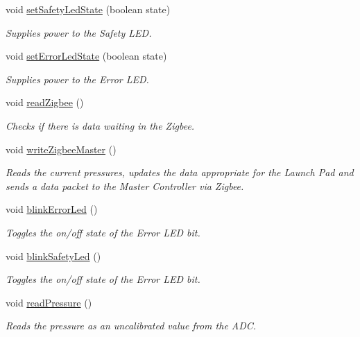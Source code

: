 \begin{DoxyCompactItemize}
\item 
void \hyperlink{launchPad_8ino_aa6ea37e78ab121d0e64b0184ed4a3e7c}{set\-Safety\-Led\-State} (boolean state)
\begin{DoxyCompactList}\small\item\em \-Supplies power to the \-Safety \-L\-E\-D. \end{DoxyCompactList}\item 
void \hyperlink{launchPad_8ino_a846b4e1765d547fb0bc878b1ae00f1d1}{set\-Error\-Led\-State} (boolean state)
\begin{DoxyCompactList}\small\item\em \-Supplies power to the \-Error \-L\-E\-D. \end{DoxyCompactList}\item 
void \hyperlink{launchPad_8ino_aa52415de65bdd171ce3eefcf2439d5bb}{read\-Zigbee} ()
\begin{DoxyCompactList}\small\item\em \-Checks if there is data waiting in the \-Zigbee. \end{DoxyCompactList}\item 
void \hyperlink{launchPad_8ino_a9ad71d5a59d49ba8ccdb3d533e9324d1}{write\-Zigbee\-Master} ()
\begin{DoxyCompactList}\small\item\em \-Reads the current pressures, updates the data appropriate for the \-Launch \-Pad and sends a data packet to the \-Master \-Controller via \-Zigbee. \end{DoxyCompactList}\item 
void \hyperlink{launchPad_8ino_a6ff0831bdafcf179423ba9adaa1f5fad}{blink\-Error\-Led} ()
\begin{DoxyCompactList}\small\item\em \-Toggles the on/off state of the \-Error \-L\-E\-D bit. \end{DoxyCompactList}\item 
void \hyperlink{launchPad_8ino_aeba3f10803047fcba38d033c747a11c7}{blink\-Safety\-Led} ()
\begin{DoxyCompactList}\small\item\em \-Toggles the on/off state of the \-Error \-L\-E\-D bit. \end{DoxyCompactList}\item 
void \hyperlink{launchPad_8ino_a97912ba0e56e077f6841f7a8f9349df1}{read\-Pressure} ()
\begin{DoxyCompactList}\small\item\em \-Reads the pressure as an uncalibrated value from the \-A\-D\-C. \end{DoxyCompactList}\item 

\end{DoxyCompactItemize}
